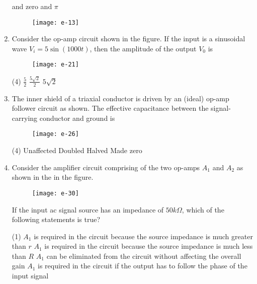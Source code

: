\begin{enumerate}
\begin{tasks}
	 and zero
	 and $\pi$
\end{tasks}
\begin{minipage}{0.45\textwidth}
\begin{figure}[H]
	\centering
	\texttt{[image: e-13]}
\end{figure}
\end{minipage}
	\item Consider the op-amp circuit shown in the figure.
	If the input is a sinusoidal wave $V_{i}=5 \sin (1000 t)$, then the amplitude of the output $V_{0}$ is
{	}
\begin{figure}[H]
\centering
\texttt{[image: e-21]}
\end{figure}
\begin{tasks}(4)
\task[\textbf{A.}] $\frac{5}{2}$
\task[\textbf{C.}] $\frac{5 \sqrt{2}}{2}$
\task[\textbf{D.}] $5 \sqrt{2}$
\end{tasks}
	\item The inner shield of a triaxial conductor is driven by an (ideal) op-amp follower circuit as shown. The effective capacitance between the signal-carrying conductor and ground is
{	}
\begin{figure}[H]
\centering
\texttt{[image: e-26]}
\end{figure}
\begin{tasks}(4)
\task[\textbf{A.}]  Unaffected
\task[\textbf{B.}] Doubled
\task[\textbf{C.}] Halved
\task[\textbf{D.}] Made zero
\end{tasks}
	\item Consider the amplifier circuit comprising of the two op-amps $A_{1}$ and $A_{2}$ as shown in the in the figure. \\
	\begin{figure}[H]
		\centering
		\texttt{[image: e-30]}
	\end{figure}
	If the input ac signal source has an impedance of $50 k \Omega$, which of the following statements is true?
{	}
\begin{tasks}(1)
\task[\textbf{A.}] $A_{1}$ is required in the circuit because the source impedance is much greater than $r$
\task[\textbf{B.}] $A_{1}$ is required in the circuit because the source impedance is much less than $R$
\task[\textbf{C.}] $A_{1}$ can be eliminated from the circuit without affecting the overall gain
\task[\textbf{D.}] $A_{1}$ is required in the circuit if the output has to follow the phase of the input signal

\end{tasks}
\end{enumerate}
